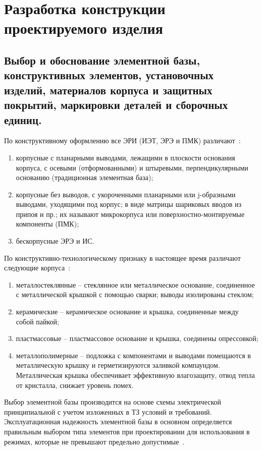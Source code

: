\section{Разработка конструкции 
  проектируемого изделия} %

\subsection{Выбор и обоснование элементной базы,
  конструктивных элементов, 
  установочных изделий, 
  материалов корпуса и защитных покрытий,
  маркировки деталей и сборочных единиц. }

По конструктивному оформлению все ЭРИ (ИЭТ, ЭРЭ и ПМК)
различают~\cite{Belyanin2008}:
\begin{enumerate}
\item корпусные с планарными выводами, лежащими в плоскости основания
корпуса, с осевыми (отформованными) и штыревыми, перпендикулярными
основанию (традиционная элементная база);
\item  корпусные без выводов, с укороченными планарными или j-образными
выводами, уходящими под корпус; в виде матрицы шариковых вводов из
припоя и пр.; их называют микрокорпуса или поверхностно-монтируемые
компоненты (ПМК);
\item  бескорпусные ЭРЭ и ИС.
\end{enumerate}

По конструктивно-технологическому признаку в настоящее время
различают следующие корпуса~\cite{Belyanin2008}:
\begin{enumerate}
\item  металлостеклянные – стеклянное или металлическое основание,
соединенное с металлической крышкой с помощью сварки; выводы
изолированы стеклом;
\item  керамические – керамическое основание и крышка, соединенные
между собой пайкой;
\item  пластмассовые – пластмассовое основание и крышка, соединены
опрессовкой;
\item  металлополимерные – подложка с компонентами и выводами
помещаются в металлическую крышку и герметизируются заливкой
компаундом. Металлическая крышка обеспечивает эффективную влагозащиту,
отвод тепла от кристалла, снижает уровень помех.
\end{enumerate}

Выбор элементной базы производится на основе схемы электрической
принципиальной с учетом изложенных в ТЗ условий и требований.
Эксплуатационная надежность элементной базы в основном определяется
правильным выбором типа элементов при проектировании для использования
в режимах, которые не превышают предельно допустимые~\cite{Alexeev2011}.

